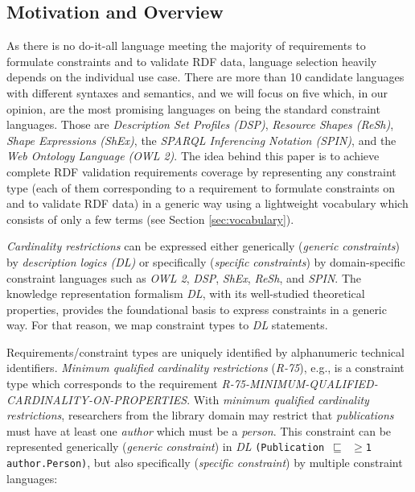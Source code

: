 \documentclass[a4paper,fontsize=11pt]{scrartcl}
\newcommand{\ms}[1]{\texttt{#1}}
\begin{document}
\subsection{Motivation and Overview}

As there is no do-it-all language meeting the majority of requirements to formulate constraints and to validate RDF data,
language selection heavily depends on the individual use case.  
There are more than 10 candidate languages with different syntaxes and semantics, and we will focus on five which, in our opinion, are the most promising languages on being the standard constraint languages. Those are
\emph{Description Set Profiles (DSP)},
\emph{Resource Shapes (ReSh)}, 
\emph{Shape Expressions (ShEx)},
the \emph{SPARQL Inferencing Notation (SPIN)}, 
and the \emph{Web Ontology Language (OWL 2)}.
The idea behind this paper is to achieve complete RDF validation requirements coverage by representing any constraint type (each of them corresponding to a requirement to formulate constraints on and to validate RDF data) in a generic way using a lightweight vocabulary which consists of only a few terms (see Section \ref{sec:vocabulary}).

\emph{Cardinality restrictions} can be expressed either generically (\emph{generic constraints}) by \emph{description logics (DL)} 
or specifically (\emph{specific constraints}) by domain-specific constraint languages such as \emph{OWL 2}, \emph{DSP}, \emph{ShEx}, \emph{ReSh}, and \emph{SPIN}.
The knowledge representation formalism {\em DL}, with its  well-studied theoretical properties, provides the foundational basis to express constraints in a generic way. 
For that reason, we map constraint types to \emph{DL} statements.

Requirements/constraint types are uniquely identified by alphanumeric technical identifiers.
\emph{Minimum qualified cardinality restrictions} (\emph{R-75}), e.g., is a constraint type which corresponds to the requirement {\small\emph{R-75-MINIMUM-QUALIFIED-CARDINALITY-ON-PROPERTIES}}. 
With \emph{minimum qualified cardinality restrictions}, researchers from the library domain may restrict
that \emph{publications} must have at least one \emph{author} which must be a \emph{person}.
This constraint can be represented generically (\emph{generic constraint}) in \emph{DL} {\small\ms{(Publication $\sqsubseteq$ $\geq$1 author.Person)}}, but also specifically (\emph{specific constraint}) by multiple constraint languages:
\end{document}
